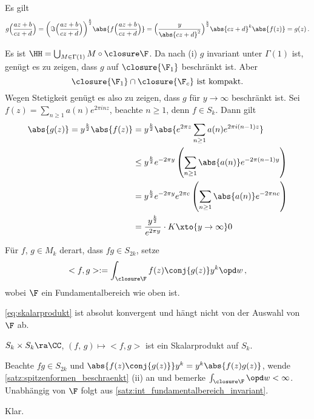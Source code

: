 \begin{bewe-list}
	\item Es gilt
	\[
		g\Bigl(\frac{az+b}{cz+d}\Bigr)
		= \biggl(\Im \Bigl(\frac{az+b}{cz+d}\Bigr)\biggl)^{\frac{k}{2}} \abs{f\Bigl(\frac{az+b}{cz+d}\Bigr)}
		= \Bigl(\frac{y}{\abs{cz+d}^2}\Bigr)^{\frac{k}{2}} \abs{cz+d}^k \abs{f(z)} = g(z)
		\,.
	\]
	
	\item Es ist $\HH = \bigcup_{M\in\Gamma(1)} M \circ \closure\F$. Da nach (i) $g$ invariant unter $\Gamma(1)$ ist, genügt es zu zeigen, dass $g$ auf $\closure{\F_1}$ beschränkt ist.
	Aber
	\[
		\closure{\F_1} \cap \closure{\F_c} \text{ ist kompakt.}
	\]
	Wegen Stetigkeit genügt es also zu zeigen, dass $g$ für $y \to \infty$ beschränkt ist.
	Sei $f(z) = \sum_{n\geq 1} a(n) e^{2\pi inz}$, beachte $n\geq1$, denn $f \in S_k$.
	Dann gilt
	\begin{align*}
		\abs{g(z)} = y^{\frac{k}{2}} \abs{f(z)}
		&= y^{\frac{k}{2}} \abs{e^{2\pi z} \sum_{n\geq 1} a(n) e^{2\pi i(n-1)z} } \\
		&\leq y^{\frac{k}{2}} e^{-2\pi y} \left( \sum_{n\geq 1} \abs{a(n)} e^{-2\pi (n-1)y} \right) \\
		&= y^{\frac{k}{2}} e^{-2\pi y} e^{2\pi c} \left( \sum_{n\geq1} \abs{a(n)} e^{-2\pi nc} \right) \\
		&= \frac{y^{\frac{k}{2}}}{e^{2\pi y}} \cdot K
		\xto{y\to\infty} 0
	\end{align*}
\end{bewe-list}

\begin{defi}
	Für $f$, $g \in M_k$ derart, dass $fg \in S_{2k}$, setze
	\begin{equation}\label{eq:skalarprodukt}
		<f, g> := \int_{\closure\F} f(z) \conj{g(z)} y^k \opd w
		\,,
	\end{equation}
	wobei $\F$ ein Fundamentalbereich wie oben ist.
\end{defi}

\begin{satz-list}
	\item \eqref{eq:skalarprodukt} ist absolut konvergent und hängt nicht von der Auswahl von $\F$ ab.
	\item $S_k \times S_k \ra \CC$, $(f,\,g) \mapsto <f,g>$ ist ein Skalarprodukt auf $S_k$.
\end{satz-list}

\begin{bewe-list}
	\item Beachte $fg \in S_{2k}$ und $\abs{f(z)\conj{g(z)}} y^k = y^k \abs{f(z)g(z)}$, wende \autoref{satz:spitzenformen_beschraenkt} (ii) an und bemerke $\int_{\closure \F} \opd w < \infty$.
	Unabhängig von $\F$ folgt aus \autoref{satz:int_fundamentalbereich_invariant}.
	\item Klar.
\end{bewe-list}